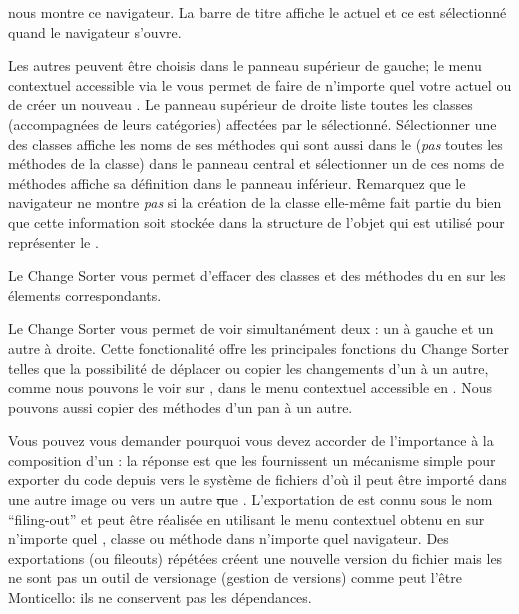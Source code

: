 \documentclass[a4paper,10pt,twoside]{book}
\begin{document}
 nous montre ce navigateur. La barre de titre affiche le \changeset actuel et ce \changeset est sélectionné quand le navigateur s'ouvre.

Les autres \changesets peuvent être choisis dans le panneau supérieur de gauche;
le menu contextuel accessible via le  vous permet de faire de
n'importe quel \changeset votre \changeset actuel ou de créer un nouveau \changeset.
Le panneau supérieur de droite liste toutes les classes 
(accompagnées de leurs catégories) affectées par le \changeset sélectionné.
Sélectionner une des classes affiche les noms de ses méthodes qui sont aussi dans
le \changeset (\emph{pas} toutes les méthodes de la classe) dans le panneau central
et sélectionner un de ces noms de méthodes affiche sa définition dans le panneau
inférieur.
Remarquez que le navigateur ne montre \emph{pas} si la création de la classe elle-même
fait partie du \changeset bien que cette information soit stockée dans la structure
de l'objet qui est utilisé pour représenter le \changeset.

Le Change Sorter vous permet d'effacer des classes et des méthodes du \changeset
en  \actclickant{} sur les élements correspondants.

Le Change Sorter vous permet de voir simultanément deux
\changesets: un \changeset à gauche et un autre à droite.
Cette fonctionalité offre les principales fonctions du Change Sorter 
telles que la possibilité de déplacer ou copier les changements d'un \changeset à un autre,
comme nous pouvons le voir sur ,
dans le menu contextuel accessible en \actclickant.
Nous pouvons aussi copier des méthodes d'un pan à un autre.

Vous pouvez vous demander pourquoi vous devez accorder de l'importance à la composition
d'un \changeset: la réponse est que les \changesets fournissent un mécanisme simple
pour exporter du code depuis \pharo vers le système de fichiers d'où il peut
être importé dans une autre image \pharo ou vers un autre \st que \pharo.
L'exportation de \changeset est connu sous le nom ``filing-out'' et peut être réalisée
en utilisant le menu contextuel obtenu en \actclickant{} sur n'importe quel \changeset, classe ou
méthode dans n'importe quel navigateur.
Des exportations (ou fileouts) répétées créent une nouvelle version du fichier
mais les \changesets ne sont pas un outil de versionage (gestion de
versions) comme peut l'être Monticello: ils ne conservent pas les dépendances.
\end{document}
